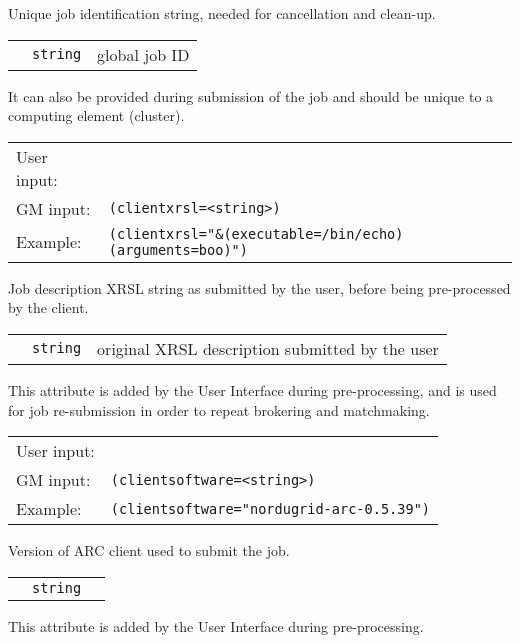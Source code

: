   Unique job identification string, needed for cancellation and clean-up. 

  \begin{tabular}{llp{10cm}}
    \hspace*{1cm}&\texttt{string} & global job ID\\
  \end{tabular}

  It can also be provided during submission of the job and should be
  unique to a computing element (cluster).

  \hspace*{0.5cm}
  \begin{shaded}
  \end{shaded}
  \begin{tabular}{lp{13cm}}
    User input:&\verb##\\
    GM input:&\verb#(clientxrsl=<string>)#\\
    Example:&\verb#(clientxrsl="&(executable=/bin/echo)(arguments=boo)")#\\
  \end{tabular}

  Job description XRSL string as submitted by the user, before being pre-processed by the client. 

  \begin{tabular}{llp{10cm}}
    \hspace*{1cm}&\texttt{string} & original XRSL description submitted by the user\\
  \end{tabular}

  This attribute is added by the User Interface during pre-processing, and is used for job re-submission in order to repeat brokering and matchmaking.

  \hspace*{0.5cm}
  \begin{shaded}
  \end{shaded}
  \begin{tabular}{lp{13cm}}
    User input:&\verb##\\
    GM input:&\verb#(clientsoftware=<string>)#\\
    Example:&\verb#(clientsoftware="nordugrid-arc-0.5.39")#\\
  \end{tabular}

  Version of ARC client used to submit the job. 

  \begin{tabular}{llp{10cm}}
    \hspace*{1cm}&\texttt{string} & \\
  \end{tabular}

  This attribute is added by the User Interface during pre-processing.
